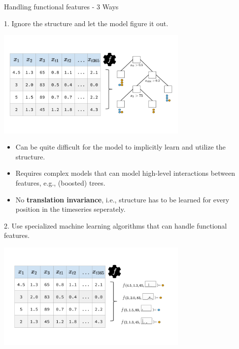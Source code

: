 \begin{vbframe}{Handling functional features - 3 Ways}
    
    1. Ignore the structure and let the model figure it out.
    \vspace*{-0.6cm}
    \begin{center}
        \includegraphics[width = 0.7\textwidth]{figure_man/tree.png}
    \end{center}
    \vspace*{-1cm}
    
    \begin{itemize}
        \item Can be quite difficult for the model to implicitly learn and utilize the structure.
        \item Requires complex models that can model high-level interactions between features, e.g., (boosted) trees.
        \item No \textbf{translation invariance}, i.e., structure has to be learned for every position in the timeseries seperately.
    \end{itemize}
    
    \framebreak
    
    2. Use specialized machine learning algorithms that can handle functional features.
    
    \vspace*{-0.6cm}
    
    \begin{center}
        \includegraphics[width = 0.7\textwidth]{figure_man/custom.png}
    \end{center}
    

\end{vbframe}

